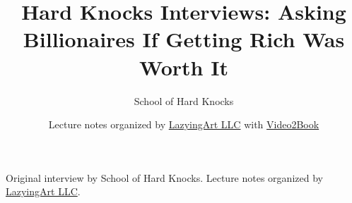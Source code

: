 \documentclass[11pt,oneside]{book}
\begin{document}
\frontmatter
\title{Hard Knocks Interviews: Asking Billionaires If Getting Rich Was Worth It}
\author{School of Hard Knocks}
\date{Lecture notes organized by \href{https://lazying.art}{LazyingArt LLC} with \href{https://github.com/lachlanchen/Video2Book}{Video2Book}}
\maketitle
\begin{center}
\small Original interview by School of Hard Knocks. Lecture notes organized by \href{https://lazying.art}{LazyingArt LLC}.
\end{center}
\clearpage
\mainmatter

\end{document}
